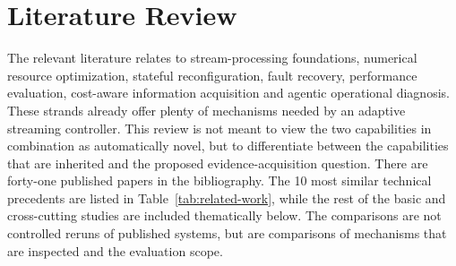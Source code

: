 \section{Literature Review}
\label{sec:literature-review}
The relevant literature relates to stream-processing foundations, numerical resource optimization, stateful reconfiguration, fault recovery, performance evaluation, cost-aware information acquisition and agentic operational diagnosis. These strands already offer plenty of mechanisms needed by an adaptive streaming controller. This review is not meant to view the two capabilities in combination as automatically novel, but to differentiate between the capabilities that are inherited and the proposed evidence-acquisition question. There are forty-one published papers in the bibliography. The 10 most similar technical precedents are listed in Table~\ref{tab:related-work}, while the rest of the basic and cross-cutting studies are included thematically below. The comparisons are not controlled reruns of published systems, but are comparisons of mechanisms that are inspected and the evaluation scope.

